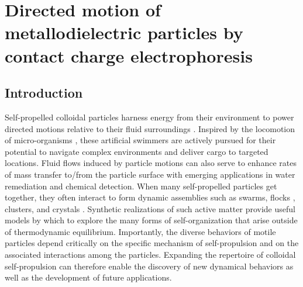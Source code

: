 \chapter{Directed motion of metallodielectric particles by contact charge electrophoresis}


\section{Introduction}

Self-propelled colloidal particles harness energy from their environment to power directed motions relative to their fluid surroundings \cite{Ebbens2015,Li2016,Dey2016}.
Inspired by the locomotion of micro-organisms \cite{Lauga2009}, these artificial swimmers are actively pursued for their potential to navigate complex environments \cite{Takagi2014,Das2015} and deliver cargo to targeted locations\cite{Gao2015,Baylis2015}.
Fluid flows induced by particle motions can also serve to enhance rates of mass transfer to/from the particle surface with emerging applications in water remediation\cite{Soler2013,Li2014} and chemical detection\cite{morales2014micromotor,kagan2009chemical}.
When many self-propelled particles get together, they often interact to form dynamic assemblies\cite{Wang2015} such as swarms\cite{Ibele2009,Nguyen2012}, flocks \cite{Bricard2013}, clusters\cite{JieZhang2016}, and crystals \cite{Palacci2013}.
Synthetic realizations of such active matter\cite{Marchetti2013} provide useful models by which to explore the many forms of self-organization that arise outside of thermodynamic equilibrium.
Importantly, the diverse behaviors of motile particles depend critically on the specific mechanism of self-propulsion and on the associated interactions among the particles.
Expanding the repertoire of colloidal self-propulsion can therefore enable the discovery of new dynamical behaviors as well as the development of future applications.

